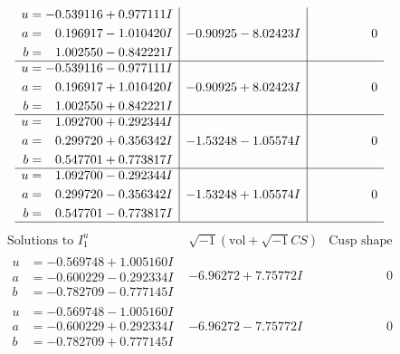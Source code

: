 \documentclass[1p]{elsarticle_modified}
\theoremstyle{definition}
\newcommand{\I}{\sqrt{-1}}
\begin{document}
$$\begin{array}{c|c|c}
\begin{aligned}
u &= -0.539116 + 0.977111 I \\
a &= \phantom{-}0.196917 - 1.010420 I \\
b &= \phantom{-}1.002550 - 0.842221 I\end{aligned}
 & -0.90925 - 8.02423 I & \phantom{-0.000000 } 0 \\ \hline\begin{aligned}
u &= -0.539116 - 0.977111 I \\
a &= \phantom{-}0.196917 + 1.010420 I \\
b &= \phantom{-}1.002550 + 0.842221 I\end{aligned}
 & -0.90925 + 8.02423 I & \phantom{-0.000000 } 0 \\ \hline\begin{aligned}
u &= \phantom{-}1.092700 + 0.292344 I \\
a &= \phantom{-}0.299720 + 0.356342 I \\
b &= \phantom{-}0.547701 + 0.773817 I\end{aligned}
 & -1.53248 - 1.05574 I & \phantom{-0.000000 } 0 \\ \hline\begin{aligned}
u &= \phantom{-}1.092700 - 0.292344 I \\
a &= \phantom{-}0.299720 - 0.356342 I \\
b &= \phantom{-}0.547701 - 0.773817 I\end{aligned}
 & -1.53248 + 1.05574 I & \phantom{-0.000000 } 0\\
 \hline 
 \end{array}$$\newpage$$\begin{array}{c|c|c}  
\text{Solutions to }I^u_{1}& \I (\text{vol} + \sqrt{-1}CS) & \text{Cusp shape}\\
 \hline 
\begin{aligned}
u &= -0.569748 + 1.005160 I \\
a &= -0.600229 - 0.292334 I \\
b &= -0.782709 - 0.777145 I\end{aligned}
 & -6.96272 + 7.75772 I & \phantom{-0.000000 } 0 \\ \hline\begin{aligned}
u &= -0.569748 - 1.005160 I \\
a &= -0.600229 + 0.292334 I \\
b &= -0.782709 + 0.777145 I\end{aligned}
 & -6.96272 - 7.75772 I & \phantom{-0.000000 } 0 \\ \hline\begin{aligned}

\end{aligned}
\end{array}$$
\end{document}
